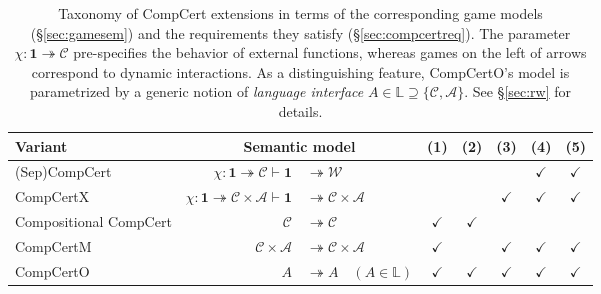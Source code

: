 \documentclass[draft,11pt]{report}
\begin{document}
\begin{table} %
  \small
  \begin{tabular}{l@{\qquad}r@{}l@{\qquad}c@{\:}c@{\:}c@{\:}c@{\:}c}
    \hline
    Variant & \multicolumn{2}{c}{Semantic model} & (1) & (2) & (3) & (4) & (5) \\
    \hline
    (Sep)CompCert \citep{compcert,sepcompcert} &
      $\chi : \mathbf{1} \twoheadrightarrow \mathcal{C}
      \vdash \mathbf{1} $ & ${} \twoheadrightarrow \mathcal{W}$ &
      & & & $\checkmark$ & $\checkmark$ \\
    CompCertX \citep{popl15} &
      \hspace{-1em}
      $\chi : \mathbf{1} \twoheadrightarrow \mathcal{C} \times \mathcal{A}
       \vdash
       \mathbf{1} $ & ${} \twoheadrightarrow \mathcal{C} \times \mathcal{A}$
      & & & $\checkmark$ & $\checkmark$ & $\checkmark$ \\
    Compositional CompCert \citep{compcompcert} &
      $\mathcal{C}$ & ${} \twoheadrightarrow \mathcal{C}$ &
      $\checkmark$ & $\checkmark$ & & & \\
    CompCertM \citep{compcertm} &
      $\mathcal{C} \times \mathcal{A} $ & ${}\twoheadrightarrow
       \mathcal{C} \times \mathcal{A}$ &
      $\checkmark$ & & $\checkmark$ & $\checkmark$ & $\checkmark$ \\
    CompCertO &
      $A $ & ${}\twoheadrightarrow A \quad
      (A \in \mathbb{L})$ &
      $\checkmark$&$\checkmark$&$\checkmark$&$\checkmark$&$\checkmark$ \\
    \hline
  \end{tabular}
  \caption{Taxonomy of CompCert extensions
    in terms of the corresponding game models (\S\ref{sec:gamesem})
    and the requirements they satisfy (\S\ref{sec:compcertreq}).
    The parameter $\chi : \mathbf{1} \twoheadrightarrow \mathcal{C}$
    pre-specifies the behavior of external functions,
    whereas games on the left of arrows
    correspond to dynamic interactions.
    As a distinguishing feature,
    CompCertO's model is parametrized by a generic notion of
    \emph{language interface}
    $A \in \mathbb{L} \supseteq \{\mathcal{C}, \mathcal{A}\}$.
    See \S\ref{sec:rw} for details.
  }
  \label{tbl:compcerts}
\end{table}
\end{document}
